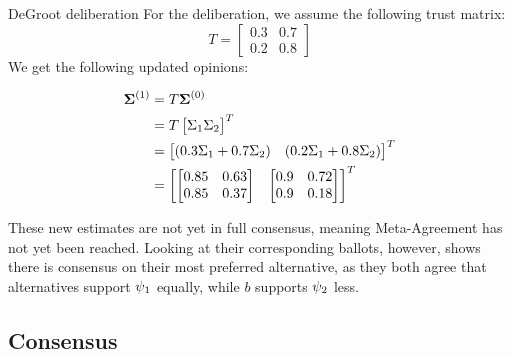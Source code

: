 \begin{example}{DeGroot deliberation} {}
For the deliberation, we assume the following trust matrix: 
\[
T= \begin{bmatrix} 
0.3 & 0.7 \\ 
0.2 & 0.8
\end{bmatrix}
\] 
We get the following updated opinions:

\begin{align*}
	\boldsymbol{\boldsymbol{\Sigma}}^{(1)}
	& =
	T\boldsymbol{\boldsymbol{\Sigma}}^{(0)}
	\\ &
	=T\begin{bmatrix}\Sigma_1
		\Sigma_2\end{bmatrix}^{T}
	\\ &
	=\begin{bmatrix}(0.3\Sigma_1
	+ 0.7\Sigma_{2}) &
(0.2\Sigma_1 +
0.8\Sigma_{2})\end{bmatrix}^{T} \\
	   & = \begin{bmatrix}
		   \begin{bmatrix}
			   0.85 & 0.63
			   \\
			   0.85 & 0.37 \end{bmatrix}
			   &
		   \begin{bmatrix}
		   0.9 & 0.72
	   \\ 0.9 & 0.18 \\
   \end{bmatrix}
	   \end{bmatrix}^{T}
\end{align*}

These new estimates are not yet in full consensus, meaning Meta-Agreement has not yet been reached.  Looking at their
corresponding ballots, however, shows there is consensus on their most preferred alternative,
as they both agree that alternatives support $\psi_1$ equally, while $b$
supports $\psi_2$ less.

\label{example:deGroot-delib}
\end{example}


\subsection{Consensus} \label{sub: concensus DeGroot}


